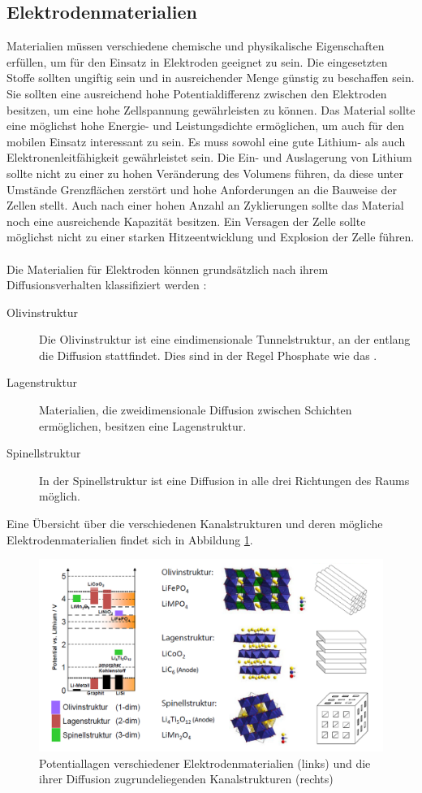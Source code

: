 \documentclass[a4paper, 11pt, headsepline,footsepline,twoside,abstract]{scrbook}
\begin{document}
\subsection{Elektrodenmaterialien}
Materialien müssen verschiedene chemische und physikalische Eigenschaften erfüllen, um für den Einsatz in Elektroden geeignet zu sein. Die eingesetzten Stoffe sollten ungiftig sein und in ausreichender Menge günstig zu beschaffen sein. Sie sollten eine ausreichend hohe Potentialdifferenz zwischen den Elektroden besitzen, um eine hohe Zellspannung gewährleisten zu können. Das Material sollte eine möglichst hohe Energie- und Leistungsdichte ermöglichen, um auch für den mobilen Einsatz interessant zu sein. Es muss sowohl eine gute Lithium- als auch Elektronenleitfähigkeit gewährleistet sein. Die Ein- und Auslagerung von Lithium sollte nicht zu einer zu hohen Veränderung des Volumens führen, da diese unter Umstände Grenzflächen zerstört und hohe Anforderungen an die Bauweise der Zellen stellt. Auch nach einer hohen Anzahl an Zyklierungen sollte das Material noch eine ausreichende Kapazität besitzen. Ein Versagen der Zelle sollte möglichst nicht zu einer starken Hitzeentwicklung und Explosion der Zelle führen.
\\\\
Die Materialien für Elektroden können grundsätzlich nach ihrem Diffusionsverhalten klassifiziert werden \cite{graf2013kathodenmaterialien}:
\begin{description}
\item[Olivinstruktur] Die Olivinstruktur ist eine eindimensionale Tunnelstruktur, an der entlang die Diffusion stattfindet. Dies sind in der Regel Phosphate wie das .
\item[Lagenstruktur] Materialien, die zweidimensionale Diffusion zwischen Schichten ermöglichen, besitzen eine Lagenstruktur.
\item[Spinellstruktur] In der Spinellstruktur ist eine Diffusion in alle drei Richtungen des Raums möglich.
\end{description}
Eine Übersicht über die verschiedenen Kanalstrukturen und deren mögliche Elektrodenmaterialien findet sich in Abbildung \ref{strukturen_elektroden}.
\begin{figure}
	\centering
	\includegraphics[width=1.0\columnwidth]{images/strukturen_elektroden.png}
	\caption{Potentiallagen verschiedener Elektrodenmaterialien (links) und die ihrer Diffusion zugrundeliegenden Kanalstrukturen (rechts) \cite{bub_skript}}
	\label{strukturen_elektroden}
\end{figure}
\end{document}
